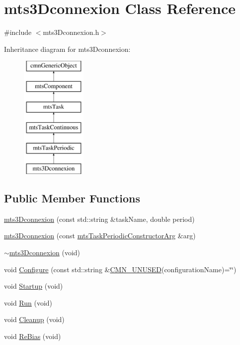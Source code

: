 \hypertarget{classmts3_dconnexion}{\section{mts3\-Dconnexion Class Reference}
\label{classmts3_dconnexion}
}


{\ttfamily \#include $<$mts3\-Dconnexion.\-h$>$}

Inheritance diagram for mts3\-Dconnexion\-:\begin{figure}[H]
\begin{center}
\leavevmode
\includegraphics[height=6.000000cm]{d9/de2/classmts3_dconnexion}
\end{center}
\end{figure}
\subsection*{Public Member Functions}
\begin{DoxyCompactItemize}
\item 
\hyperlink{classmts3_dconnexion_ad49b2b97841c142d8021edfbe629d9b2}{mts3\-Dconnexion} (const std\-::string \&task\-Name, double period)
\item 
\hyperlink{classmts3_dconnexion_a630e27750245f2f3c24d046f0e4c570e}{mts3\-Dconnexion} (const \hyperlink{classmts_task_periodic_constructor_arg}{mts\-Task\-Periodic\-Constructor\-Arg} \&arg)
\item 
\hyperlink{classmts3_dconnexion_a1286e109cc2c92f6a3d11895c32f07a1}{$\sim$mts3\-Dconnexion} (void)
\item 
void \hyperlink{classmts3_dconnexion_ae5ef64e0d4f574a7f088bba86867ef94}{Configure} (const std\-::string \&\hyperlink{cmn_portability_8h_a021894e2626935fa2305434b1e893ff6}{C\-M\-N\-\_\-\-U\-N\-U\-S\-E\-D}(configuration\-Name)=\char`\"{}\char`\"{})
\item 
void \hyperlink{classmts3_dconnexion_ab436d4b2b3fb4e8b9f37851835bf4a1d}{Startup} (void)
\item 
void \hyperlink{classmts3_dconnexion_a8ea74b76b74ae0bb7e1e6c491869bfc0}{Run} (void)
\item 
void \hyperlink{classmts3_dconnexion_ae572a75acb1f734e5365854806102552}{Cleanup} (void)
\item 
void \hyperlink{classmts3_dconnexion_a2c0237a3ea1756708959c6848b8447b2}{Re\-Bias} (void)
\end{DoxyCompactItemize}
